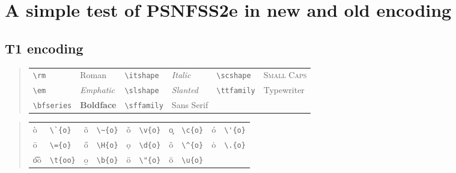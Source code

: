 \documentclass[11pt]{article}
\begin{document}
\section{A simple test of PSNFSS2e in new and old encoding}

\subsection{T1 encoding}

\begin{quote}\begin{tabular}{|ll|ll|ll|}\hline
\verb|\rm|   & \rm Roman         & \verb|\itshape|   & \itshape Italic
                                  & \verb|\scshape|   & \scshape Small Caps    \\
\verb|\em|   & \em Emphatic      & \verb|\slshape| & \slshape Slanted
                                  & \verb|\ttfamily|   & \ttfamily Typewriter     \\
\verb|\bfseries|   & \bfseries Boldface      & \verb|\sffamily| & \sffamily Sans Serif & &
\\ \hline
\end{tabular}\end{quote}

\begin{quote}\begin{tabular}{|*{5}{ll|}}\hline
\`{o} & \verb|\`{o}|  & \~{o}  & \verb|\~{o}|  & \v{o}  & \verb|\v{o}| &
\c{o}  & \verb|\c{o}|  & \'{o} & \verb|\'{o}|  \\
\={o} & \verb|\={o}|  & \H{o}  & \verb|\H{o}| & \d{o}  & \verb|\d{o}| &
\^{o}  & \verb|\^{o}|  & \.{o}  & \verb|\.{o}|  \\
\t{oo} & \verb|\t{oo}| & \b{o}  & \verb|\b{o}| & \"{o} & \verb|\"{o}| &
\u{o}  & \verb|\u{o}|  && \\ \hline
\end{tabular}\end{quote}
\end{document}
